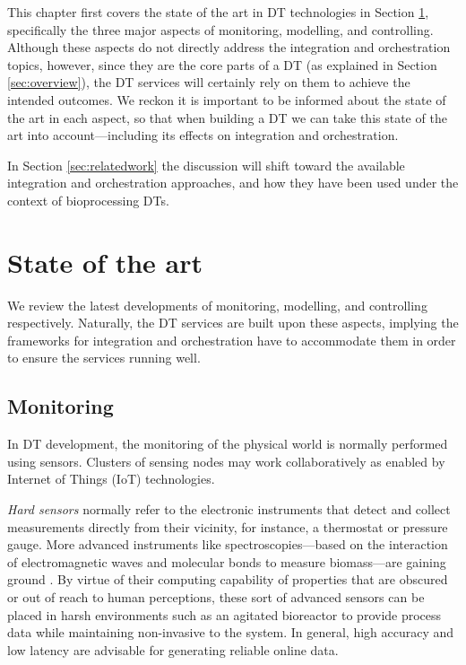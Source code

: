 This chapter first covers the state of the art in DT technologies in Section \ref{sec:sota}, specifically the three major aspects of monitoring, modelling, and controlling. Although these aspects do not directly address the integration and orchestration topics, however, since they are the core parts of a DT (as explained in Section \ref{sec:overview}), the DT services will certainly rely on them to achieve the intended outcomes. We reckon it is important to be informed about the state of the art in each aspect, so that when building a DT we can take this state of the art into account---including its effects on integration and orchestration.

In Section \ref{sec:relatedwork} the discussion will shift toward the available integration and orchestration approaches, and how they have been used under the context of bioprocessing DTs.

\section{State of the art}\label{sec:sota}

We review the latest developments of monitoring, modelling, and controlling respectively. Naturally, the DT services are built upon these aspects, implying the frameworks for integration and orchestration have to accommodate them in order to ensure the services running well.

\subsection{Monitoring} \label{sec:monitoring}
In DT development, the monitoring of the physical world is normally performed using sensors. Clusters of sensing nodes may work collaboratively as enabled by Internet of Things (IoT) technologies. 

\textit{Hard sensors} normally refer to the electronic instruments that detect and collect measurements directly from their vicinity, for instance, a thermostat or pressure gauge. More advanced instruments like spectroscopies---based on the interaction of electromagnetic waves and molecular bonds to measure biomass---are gaining ground \cite{Gargalo2020}. By virtue of their computing capability of properties that are obscured or out of reach to human perceptions, these sort of advanced sensors can be placed in harsh environments such as an agitated bioreactor to provide process data while maintaining non-invasive to the system. In general, high accuracy and low latency are advisable for generating reliable online data.

